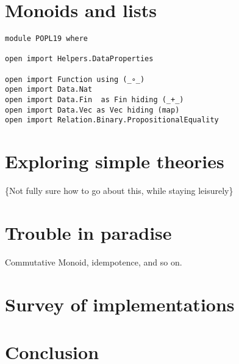 \documentclass[acmsmall,review,anonymous,prologue,dvipsnames]{acmart}
\begin{document}
\section{ Monoids and lists}
\label{sec:monoid}


\begin{verbatim}
module POPL19 where

open import Helpers.DataProperties

open import Function using (_∘_)
open import Data.Nat
open import Data.Fin  as Fin hiding (_+_)
open import Data.Vec as Vec hiding (map)
open import Relation.Binary.PropositionalEquality
\end{verbatim}

\section{Exploring simple theories}
\label{sec:exploring}
\{Not fully sure how to go about this, while staying
leisurely\}

\section{Trouble in paradise}
\label{sec:trouble}
Commutative Monoid, idempotence, and so on.

\section{Survey of implementations}

\section{Conclusion}

\label{sec:survey}
\end{document}

